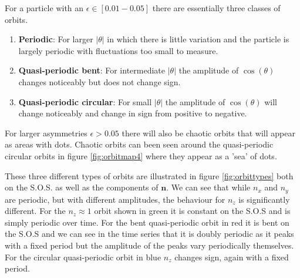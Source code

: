 For a particle with an $\epsilon \in \left[0.01-0.05\right]$ there are essentially three classes of orbits.

\begin{enumerate}
\item \textbf{Periodic}: For larger $\left|\theta\right|$ in which there is little variation and the particle is largely periodic with fluctuations too small to measure.
\item \textbf{Quasi-periodic bent}: For intermediate $\left|\theta\right|$ the amplitude of $\cos(\theta)$ changes noticeably but does not change sign.
\item \textbf{Quasi-periodic circular}: For small $\left|\theta\right|$ the amplitude of $\cos(\theta)$ will change noticeably and change in sign from positive to negative.
\end{enumerate}

For larger asymmetries $\epsilon > 0.05$ there will also be chaotic orbits that will appear as areas with dots. Chaotic orbits can been seen around the quasi-periodic circular orbits in figure \ref{fig:orbitmap4} where they appear as a 'sea' of dots.

These three different types of orbits are illustrated in figure \ref{fig:orbittypes} both on the S.O.S. as well as the 
components of $\mathbf{n}$. We can see that while $n_x$ and $n_y$ are periodic, but with different amplitudes, the 
behaviour for $n_z$ is significantly different. For the $n_z \approx 1$  orbit shown in green it is constant on the S.O.S and is simply periodic over time. For the bent quasi-periodic orbit in red it is bent on the S.O.S and we can see in the time series that it is doubly periodic as it peaks with a fixed period but the amplitude of the peaks vary periodically themselves. For the circular quasi-periodic orbit in blue $n_z$ changes sign, again with a fixed 
period.




